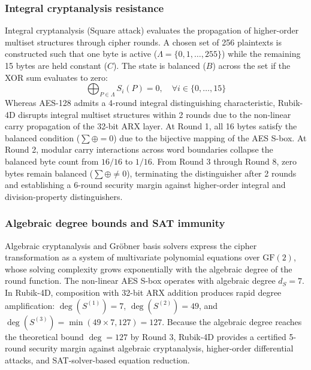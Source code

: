 \documentclass[10pt,twocolumn]{article}
\begin{document}
\subsubsection{Integral cryptanalysis resistance}
Integral cryptanalysis (Square attack) evaluates the propagation of higher-order multiset structures through cipher rounds. A chosen set of 256 plaintexts is constructed such that one byte is active ($\Lambda = \{0, 1, \dots, 255\}$) while the remaining 15 bytes are held constant ($C$). The state is balanced ($B$) across the set if the XOR sum evaluates to zero:
\begin{equation}
    \bigoplus_{P \in \Lambda} S_i(P) = 0, \quad \forall i \in \{0, \dots, 15\}
\end{equation}
Whereas AES-128 admits a 4-round integral distinguishing characteristic, Rubik-4D disrupts integral multiset structures within 2 rounds due to the non-linear carry propagation of the 32-bit ARX layer. At Round 1, all 16 bytes satisfy the balanced condition ($\sum \oplus = 0$) due to the bijective mapping of the AES S-box. At Round 2, modular carry interactions across word boundaries collapse the balanced byte count from $16/16$ to $1/16$. From Round 3 through Round 8, zero bytes remain balanced ($\sum \oplus \neq 0$), terminating the distinguisher after 2 rounds and establishing a 6-round security margin against higher-order integral and division-property distinguishers.

\subsubsection{Algebraic degree bounds and SAT immunity}
Algebraic cryptanalysis and Gröbner basis solvers express the cipher transformation as a system of multivariate polynomial equations over $\text{GF}(2)$, whose solving complexity grows exponentially with the algebraic degree of the round function. The non-linear AES S-box operates with algebraic degree $d_S = 7$. In Rubik-4D, composition with 32-bit ARX addition produces rapid degree amplification: $\deg(S^{(1)}) = 7$, $\deg(S^{(2)}) = 49$, and $\deg(S^{(3)}) = \min(49 \times 7, 127) = 127$. Because the algebraic degree reaches the theoretical bound $\deg = 127$ by Round 3, Rubik-4D provides a certified 5-round security margin against algebraic cryptanalysis, higher-order differential attacks, and SAT-solver-based equation reduction.
\end{document}
